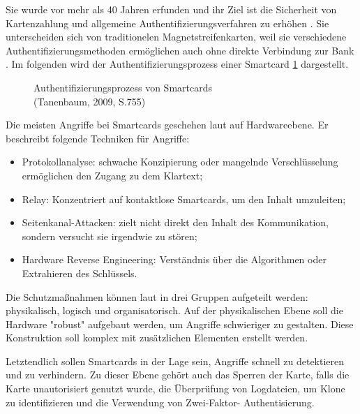 Sie wurde vor mehr als 40 Jahren erfunden und ihr Ziel ist die Sicherheit von Kartenzahlung und allgemeine
Authentifizierungsverfahren zu erhöhen \cite{refip:JFSB}. Sie unterscheiden sich von traditionelen 
Magnetstreifenkarten, weil sie verschiedene Authentifizierungsmethoden ermöglichen auch ohne direkte 
Verbindung zur Bank \cite{refbook:ATMS}. Im folgenden wird der Authentifizierungsprozess einer Smartcard 
\ref{fig:refbook_ATMS} dargestellt. 


\vfill
\begin{figure}[H]
   \caption{Authentifizierungsprozess von Smartcards\\(Tanenbaum, 2009, S.755)}
   \label{fig:refbook_ATMS}
\end{figure}
\vfill

Die meisten Angriffe bei Smartcards geschehen laut \cite{refmas:ASSS} auf Hardwareebene.
Er beschreibt folgende Techniken für Angriffe:

\begin{itemize}
    \item Protokollanalyse: schwache Konzipierung oder mangelnde Verschlüsselung ermöglichen den Zugang 
    zu dem Klartext; 
    \item Relay: Konzentriert auf kontaktlose Smartcards, um den Inhalt umzuleiten;
    \item Seitenkanal-Attacken: zielt nicht direkt den Inhalt des Kommunikation, sondern versucht sie
    irgendwie zu stören;
    \item Hardware Reverse Engineering: Verständnis über die Algorithmen oder Extrahieren des Schlüssels.
\end{itemize}


Die Schutzmaßnahmen können laut \cite{refmas:ASSS} in drei Gruppen aufgeteilt werden: physikalisch,
logisch und organisatorisch. Auf der physikalischen Ebene soll die Hardware "robust" aufgebaut werden,
um Angriffe schwieriger zu gestalten. Diese Konstruktion soll komplex mit zusätzlichen Elementen erstellt
werden. 


Letztendlich sollen Smartcards in der Lage sein, Angriffe schnell zu detektieren und zu verhindern.
Zu dieser Ebene gehört auch das Sperren der Karte, falls die Karte unautorisiert genutzt wurde, 
die Überprüfung von Logdateien, um Klone zu identifizieren und die Verwendung von Zwei-Faktor-
Authentisierung.
